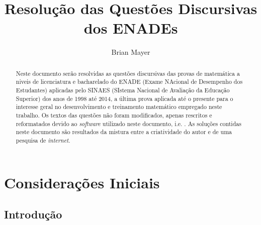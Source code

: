 \documentclass{report}
\title{\color{blue} Resolu\c c\~ao das Quest\~oes Discursivas dos ENADEs}
\author{\sc Brian Mayer}
\begin{document}
\maketitle

\begin{abstract}

Neste documento ser\~ao resolvidas as quest\~oes discursivas das provas de matem\'atica a niveis de licenciatura e bacharelado do ENADE (Exame NAcional de Desempenho dos Estudantes) aplicadas pelo SINAES (SIstema Nacional de Avalia\c c\~ao da Educa\c c\~ao Superior) dos anos de 1998 at\'e 2014, a \'ultima prova aplicada at\'e o presente para o interesse geral no desenvolvimento e treinamento matem\'atico empregado neste trabalho. Os textos das quest\~oes n\~ao foram modificados, apenas rescritos e reformatados devido ao {\it software} utilizado neste documento, i.e. \LaTeXe. As solu\c c\~oes contidas neste documento s\~ao resultados da mistura entre a criatividade do autor e de uma pesquisa de {\it internet}. 

\end{abstract}

\tableofcontents

\part{Considera\c c\~oes Iniciais}

\chapter{Introdu\c c\~ao}
\end{document}
